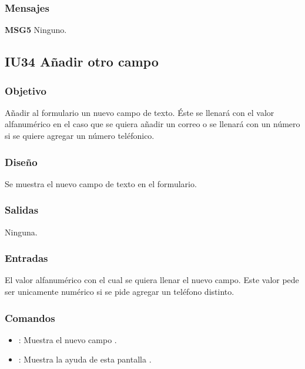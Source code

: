 \subsubsection{Mensajes}
	\begin{Citemize}
		\item {\bf MSG5} Ninguno.
	\end{Citemize}
	

\subsection{IU34 Añadir otro campo}

\subsubsection{Objetivo}
	Añadir al formulario un nuevo campo de texto. Éste se llenará con el valor alfanumérico en el caso que se quiera añadir un correo o se llenará con un número si se quiere agregar un número teléfonico.

\subsubsection{Diseño}
	Se muestra el nuevo campo de texto en el formulario.


\subsubsection{Salidas}

	Ninguna.

\subsubsection{Entradas}
	El valor alfanumérico con el cual se quiera llenar el nuevo campo. Este valor pede ser unicamente numérico si se pide agregar un teléfono distinto.

\subsubsection{Comandos}
\begin{itemize}
	\item {}: Muestra el nuevo campo .
	\item {}: Muestra la ayuda de esta pantalla .
\end{itemize}

